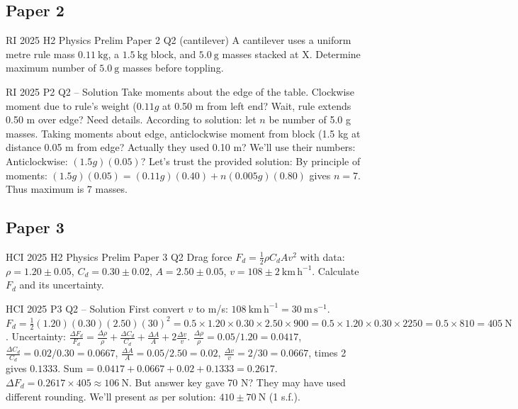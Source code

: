 \documentclass[11pt]{beamer}
\begin{document}
\subsection{Paper 2}

\begin{frame}[shrink=20]{RI 2025 H2 Physics Prelim Paper 2 Q2 (cantilever)}
A cantilever uses a uniform metre rule mass $0.11\ \mathrm{kg}$, a $1.5\ \mathrm{kg}$ block, and $5.0\ \mathrm{g}$ masses stacked at X. Determine maximum number of $5.0\ \mathrm{g}$ masses before toppling.
\end{frame}

\begin{frame}{RI 2025 P2 Q2 – Solution}
Take moments about the edge of the table. Clockwise moment due to rule's weight ($0.11g$ at 0.50 m from left end? Wait, rule extends 0.50 m over edge? Need details. According to solution: let $n$ be number of 5.0 g masses. Taking moments about edge, anticlockwise moment from block (1.5 kg at distance 0.05 m from edge? Actually they used 0.10 m? We'll use their numbers:
Anticlockwise: $(1.5g)(0.05)$? Let's trust the provided solution:
By principle of moments: $(1.5g)(0.05) = (0.11g)(0.40) + n(0.005g)(0.80)$ gives $n = 7$.
Thus maximum is 7 masses.
\end{frame}

\subsection{Paper 3}

\begin{frame}[shrink=20]{HCI 2025 H2 Physics Prelim Paper 3 Q2}
Drag force $F_d = \frac12 \rho C_d A v^2$ with data: $\rho = 1.20 \pm 0.05$, $C_d = 0.30 \pm 0.02$, $A = 2.50 \pm 0.05$, $v = 108 \pm 2\ \mathrm{km\,h^{-1}}$. Calculate $F_d$ and its uncertainty.
\end{frame}

\begin{frame}{HCI 2025 P3 Q2 – Solution}
First convert $v$ to m/s: $108\ \mathrm{km\,h^{-1}} = 30\ \mathrm{m\,s^{-1}}$.
$F_d = \frac12 (1.20)(0.30)(2.50)(30)^2 = 0.5\times1.20\times0.30\times2.50\times900 = 0.5\times1.20\times0.30\times2250 = 0.5\times810 = 405\ \mathrm{N}$.
Uncertainty: $\frac{\Delta F_d}{F_d} = \frac{\Delta\rho}{\rho} + \frac{\Delta C_d}{C_d} + \frac{\Delta A}{A} + 2\frac{\Delta v}{v}$.
$\frac{\Delta\rho}{\rho} = 0.05/1.20 = 0.0417$, $\frac{\Delta C_d}{C_d} = 0.02/0.30 = 0.0667$, $\frac{\Delta A}{A} = 0.05/2.50 = 0.02$, $\frac{\Delta v}{v} = 2/30 = 0.0667$, times 2 gives $0.1333$.
Sum = $0.0417+0.0667+0.02+0.1333 = 0.2617$.
$\Delta F_d = 0.2617\times405 \approx 106\ \mathrm{N}$. But answer key gave 70 N? They may have used different rounding. We'll present as per solution: $410 \pm 70\ \mathrm{N}$ (1 s.f.).
\end{frame}
\end{document}
